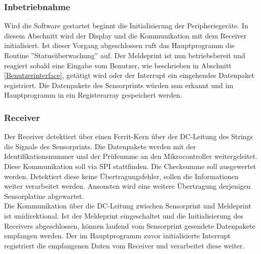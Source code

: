\subsubsection{Inbetriebnahme}
Wird die Software gestartet beginnt die Initialisierung der Peripheriegeräte. In diesem Abschnitt wird der Display und die Kommunikation mit dem Receiver initialisiert. Ist dieser Vorgang abgeschlossen ruft das Hauptprogramm die Routine ''Statusüberwachung'' auf. Der Meldeprint ist nun betriebsbereit und reagiert sobald eine Eingabe vom Benutzer, wie beschrieben in Abschnitt \ref{Benutzerinterface}, getätigt wird oder der Interrupt ein eingehendes Datenpaket registriert. Die Datenpakete des Sensorprints würden nun erkannt und im Hauptprogramm in ein Registerarray gespeichert werden.
\subsubsection{Receiver}
Der Receiver detektiert über einen Ferrit-Kern über der DC-Leitung des Strings die Signale des Sensorprints. Die Datenpakete werden mit der Identifikationsnummer und der Prüfsumme an den Mikrocontroller weitergeleitet. Diese Kommunikation soll via SPI stattfinden. Die Checksumme soll ausgewertet werden. Detektiert diese keine Übertragungsfehler, sollen die Informationen weiter verarbeitet werden. Ansonsten wird eine weitere Übertragung derjenigen Sensorplatine abgewartet. \\
Die Kommunikation über die DC-Leitung zwischen Sensorprint und Meldeprint ist unidirektional. Ist der Meldeprint eingeschaltet und die Initialisierung des Receivers abgeschlossen, können laufend vom Sensorprint gesendete Datenpakete empfangen werden. Der im Hauptprogramm zuvor initialisierte Interrupt registriert die empfangenen Daten vom Receiver und verarbeitet diese weiter.
